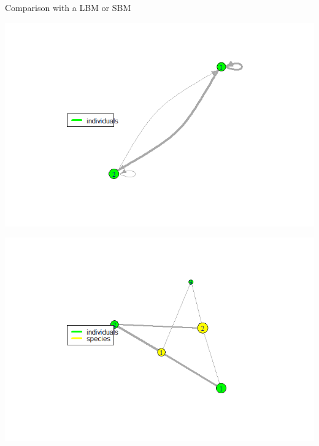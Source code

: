\documentclass[compress,10pt]{beamer}
\begin{document}
    
\begin{frame}{Comparison with a LBM or SBM}


 \centering  

\hspace{-3em}
\begin{minipage}[c]{.46\linewidth}
     \includegraphics[width = 1.5 \linewidth]{plots/res_MIRES_SBM_individuals.png}
\end{minipage} \hfill
   \begin{minipage}[c]{.46\linewidth}
 \includegraphics[width = 1.5\linewidth]{plots/res_MIRES_species.png}
   \end{minipage}
   
 \centering  
 \end{frame}
    
\end{document}
